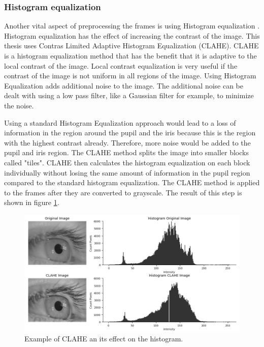 \subsubsection{Histogram equalization }
Another vital aspect of preprocessing the frames is using Histogram equalization \cite{noauthor_opencv_nodate}. Histogram equalization has the effect of increasing the contrast of the image. This thesis uses Contras Limited Adaptive Histogram Equalization (CLAHE). CLAHE is a histogram equalization method that has the benefit that it is adaptive to the local contrast of the image. Local contrast equalization is very useful if the contrast of the image is not uniform in all regions of the image. Using Histogram Equalization adds additional noise to the image. The additional noise can be dealt with using a low pass filter, like a Gaussian filter for example, to minimize the noise. 

 Using a standard Histogram Equalization approach would lead to a loss of information in the region around the pupil and the iris because this is the region with the highest contrast already. Therefore, more noise would be added to the pupil and iris region. The CLAHE method splits the image into smaller blocks called "tiles". CLAHE then calculates the histogram equalization on each block individually without losing the same amount of information in the pupil region compared to the standard histogram equalization. The CLAHE method is applied to the frames after they are converted to grayscale. The result of this step is shown in figure \ref{fig:clahe}. 

\begin{figure}[h]
    \centering
    \includegraphics[width=1\textwidth]{plots/clahe.png}
    \caption{Example of CLAHE an its effect on the histogram.}
    \label{fig:clahe}
\end{figure}

